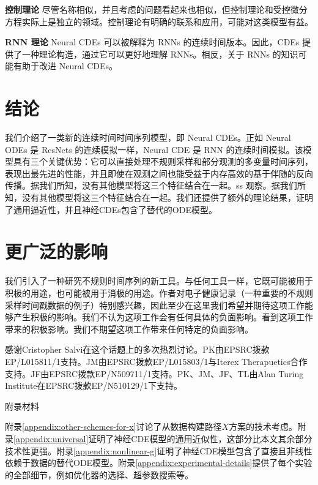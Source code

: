 \documentclass{ctexart}
\theoremstyle{plain}
\theoremstyle{definition}
\newcommand{\boldheading}[1]{

\textbf{#1}\quad}
\begin{document}
	\boldheading{控制理论}
	尽管名称相似，并且考虑的问题看起来也相似，但控制理论和受控微分方程实际上是独立的领域。控制理论有明确的联系和应用，可能对这类模型有益。
	
	\boldheading{RNN 理论}
	Neural CDEs 可以被解释为 RNNs 的连续时间版本。因此，CDEs 提供了一种理论构造，通过它可以更好地理解 RNNs。相反，关于 RNNs 的知识可能有助于改进 Neural CDEs。
	
	\section{结论}
	我们介绍了一类新的连续时间时间序列模型，即 Neural CDEs。正如 Neural ODEs 是 ResNets 的连续模拟一样，Neural CDE 是 RNN 的连续时间模拟。该模型具有三个关键优势：它可以直接处理不规则采样和部分观测的多变量时间序列，表现出最先进的性能，并且即使在观测之间也能受益于内存高效的基于伴随的反向传播。据我们所知，没有其他模型将这三个特征结合在一起。ss 观察。据我们所知，没有其他模型将这三个特征结合在一起。我们还提供了额外的理论结果，证明了通用逼近性，并且神经CDEs包含了替代的ODE模型。

\section*{更广泛的影响}
我们引入了一种研究不规则时间序列的新工具。与任何工具一样，它既可能被用于积极的用途，也可能被用于消极的用途。作者对电子健康记录（一种重要的不规则采样时间戳数据的例子）特别感兴趣，因此至少在这里我们希望并期待这项工作能够产生积极的影响。我们不认为这项工作会有任何具体的负面影响。看到这项工作带来的积极影响。我们不期望这项工作带来任何特定的负面影响。
\begin{ack}
	感谢Cristopher Salvi在这个话题上的多次热烈讨论。PK由EPSRC拨款EP/L015811/1支持。JM由EPSRC拨款EP/L015803/1与Iterex Therapuetics合作支持。JF由EPSRC拨款EP/N509711/1支持。PK、JM、JF、TL由Alan Turing Institute在EPSRC拨款EP/N510129/1下支持。
\end{ack}
	
	\small
	
	 
	
	\normalsize
	\newpage
	\appendix
\begin{center}
	\huge 附录材料
\end{center}
	附录\ref{appendix:other-schemes-for-x}讨论了从数据构建路径$X$方案的技术考虑。附录\ref{appendix:universal}证明了神经CDE模型的通用近似性，这部分比本文其余部分技术性更强。附录\ref{appendix:nonlinear-g}证明了神经CDE模型包含了直接且非线性依赖于数据的替代ODE模型。附录\ref{appendix:experimental-details}提供了每个实验的全部细节，例如优化器的选择、超参数搜索等。
	
\end{document}

